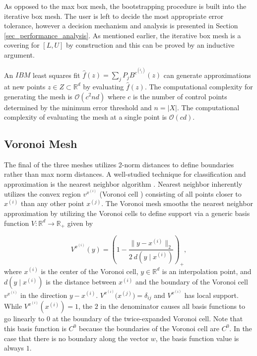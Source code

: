 As opposed to the max box mesh, the bootstrapping procedure is built into the iterative box mesh. The user is left to decide the most appropriate error tolerance, however a decision mechanism and analysis is presented in Section \ref{sec_performance_analysis}. As mentioned earlier, the iterative box mesh is a covering for $[L,U]$ by construction and this can be proved by an inductive argument.

An $IBM$ least squares fit $\hat f(z) = \sum_{j}P_j B^{c^{(i_j)}}(z)$ can generate approximations at new points $z \in Z \subset \mathbb{R}^d$ by evaluating $\hat f(z)$. The computational complexity for generating the mesh is $\mathcal{O}(c^2 n d)$ where $c$ is the number of control points determined by the minimum error threshold and $n = |X|$. The computational complexity of evaluating the mesh at a single point is $\mathcal{O}(c d)$.

\subsection{Voronoi Mesh}

The final of the three meshes utilizes 2-norm distances to define boundaries rather than max norm distances. A well-studied technique for classification and approximation is the nearest neighbor algorithm \cite{cover1967nearest}. Nearest neighbor inherently utilizes the convex region $v^{x^{(i)}}$ (Voronoi cell \cite{dirichlet1850reduction}) consisting of all points closer to $x^{(i)}$ than any other point $x^{(j)}$. The Voronoi mesh smooths the nearest neighbor approximation by utilizing the Voronoi cells to define support via a generic basis function $V: \mathbb{R}^d \rightarrow \mathbb{R}_+$ given by

$$ V^{x^{(i)}}(y) = \left(1 - \frac{\bigl\|y - x^{(i)}\bigr\|_2}{2 \ d(y \mid x^{(i)})} \right)_+, $$
where $x^{(i)}$ is the center of the Voronoi cell, $y \in \mathbb{R}^d$ is an interpolation point, and $d(y \mid x^{(i)})$ is the distance between $x^{(i)}$ and the boundary of the Voronoi cell $v^{x^{(i)}}$ in the direction $y - x^{(i)}$. $V^{x^{(i)}}\bigl(x^{(j)}\bigr) = \delta_{ij}$ and $V^{x^{(i)}}$ has local support. While $V^{x^{(i)}}(x^{(i)}) = 1$, the $2$ in the denominator causes all basis functions to go linearly to $0$ at the boundary of the twice-expanded Voronoi cell. Note that this basis function is $C^0$ because the boundaries of the Voronoi cell are $C^0$. In the case that there is no boundary along the vector $w$, the basis function value is always $1$.

